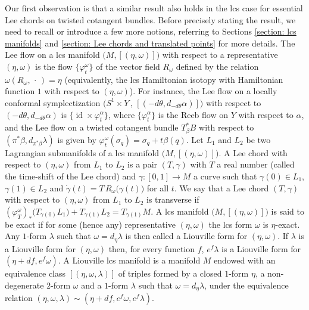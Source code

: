 \documentclass{amsart}
\DeclareMathOperator{\id}{id}
\theoremstyle{remark}
\begin{document}
Our first observation is that
a similar result also holds in the lcs case
for essential Lee chords
on twisted cotangent bundles.
Before precisely stating the result,
we need to recall or introduce a few more notions,
referring to Sections \ref{section: lcs manifolds}
and \ref{section: Lee chords and translated points}
for more details.
The Lee flow on a lcs manifold $\big( M , [(\eta, \omega)] \big)$
with respect to a representative $(\eta, \omega)$
is the flow $\{\varphi_t^{\omega}\}$ of the vector field $R_{\omega}$
defined by the relation $\omega (R_{\omega}, \,\cdot\,) = \eta$
(equivalently, the lcs Hamiltonian isotopy
with Hamiltonian function $1$
with respect to $(\eta, \omega)$).
For instance,
the Lee flow on a locally conformal symplectization
$\big( S^1 \times Y \,,\, [(-d\theta, d_{-d\theta}\alpha)] \big)$
with respect to $(-d\theta, d_{-d\theta}\alpha)$
is $ \{ \id \times \varphi_t^{\alpha} \}$,
where $\{\varphi_t^{\alpha}\}$ is the Reeb flow on $Y$
with respect to $\alpha$,
and the Lee flow on a twisted cotangent bundle $T^{\ast}_{\beta}B$
with respect to $(\pi^{\ast}\beta, d_{\pi^{\ast}\beta}\lambda)$
is given by $\varphi_t^{\omega} (\sigma_q) = \sigma_q + t \beta (q)$.
Let $L_1$ and $L_2$ be two Lagrangian submanifolds
of a lcs manifold $\big( M , [(\eta, \omega)] \big)$.
A Lee chord with respect to $(\eta, \omega)$ from $L_1$ to $L_2$
is a pair $(T, \gamma)$ with $T$ a real number
(called the time-shift of the Lee chord)
and $\gamma: [0, 1] \rightarrow M$
a curve such that $\gamma(0) \in L_1$,
$\gamma(1) \in L_2$
and $\dot{\gamma} (t) = T \, R_{\omega} \big(\gamma(t)\big)$
for all $t$. 
We say that a Lee chord $(T, \gamma)$
with respect to $(\eta, \omega)$
from $L_1$ to $L_2$
is transverse if
$(\varphi_T^{\omega})_{\ast} \big( T_{\gamma(0)}L_1 \big) + T_{\gamma(1)}L_2
= T_{\gamma(1)} M$.
A lcs manifold $\big( M , [(\eta, \omega)] \big)$
is said to be exact if for some (hence any) representative $(\eta, \omega)$
the lcs form $\omega$ is $\eta$-exact.
Any $1$-form $\lambda$ such that $\omega = d_{\eta}\lambda$
is then called a Liouville form for $(\eta, \omega)$.
If $\lambda$ is a Liouville form for $(\eta, \omega)$
then, for every function $f$,
$e^f \lambda$ is a Liouville form for $(\eta + df, e^f\omega)$.
A Liouville lcs manifold is a manifold $M$
endowed with an equivalence class $[(\eta, \omega,\lambda)]$
of triples formed by a closed $1$-form $\eta$,
a non-degenerate $2$-form $\omega$
and a $1$-form $\lambda$ such that $\omega = d_{\eta}\lambda$,
under the equivalence relation $(\eta, \omega, \lambda) \sim (\eta + df, e^f\omega, e^f\lambda)$.
\end{document}
